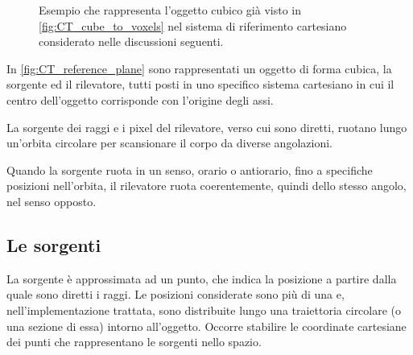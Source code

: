 \documentclass[12pt,a4paper]{report}
\begin{document}
\begin{figure}[H]
{
  }
  \caption{\label{fig:CT_reference_plane} Esempio che rappresenta l'oggetto cubico già visto in \autoref{fig:CT_cube_to_voxels}
           nel sistema di riferimento cartesiano considerato nelle discussioni seguenti.}
\end{figure}

In \autoref{fig:CT_reference_plane} sono rappresentati un oggetto di forma cubica, la sorgente ed il rilevatore, tutti posti
in uno specifico sistema cartesiano in cui il centro dell'oggetto corrisponde con l'origine degli assi.

La sorgente dei raggi e i pixel del rilevatore, verso cui sono diretti, ruotano lungo un'orbita circolare per scansionare il corpo
da diverse angolazioni.

Quando la sorgente ruota in un senso, orario o antiorario, fino a specifiche posizioni nell'orbita, il rilevatore ruota
coerentemente, quindi dello stesso angolo, nel senso opposto.

\subsection{Le sorgenti} \label{subsec:sources}

La sorgente è approssimata ad un punto, che indica la posizione a partire dalla quale sono diretti i raggi.
Le posizioni considerate sono più di una e, nell'implementazione trattata, sono distribuite lungo una traiettoria circolare
(o una sezione di essa) intorno all'oggetto.
Occorre stabilire le coordinate cartesiane dei punti che rappresentano le sorgenti nello spazio.
\end{document}
